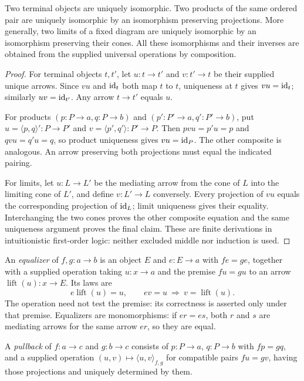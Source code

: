 \begin{proposition}\label{prop:universal-unique}
Two terminal objects are uniquely isomorphic.  Two products of the same
ordered pair are uniquely isomorphic by an isomorphism preserving projections.
More generally, two limits of a fixed diagram are uniquely isomorphic by an
isomorphism preserving their cones.  All these isomorphisms and their inverses
are obtained from the supplied universal operations by composition.
\end{proposition}
\begin{proof}
For terminal objects $t,t'$, let $u:t\to t'$ and $v:t'\to t$ be their supplied
unique arrows.  Since $vu$ and $\operatorname{id}_t$ both map $t$ to $t$, uniqueness at $t$
gives $vu=\operatorname{id}_t$; similarly $uv=\operatorname{id}_{t'}$.  Any arrow $t\to t'$ equals $u$.

For products $(p:P\to a,q:P\to b)$ and $(p':P'\to a,q':P'\to b)$, put
$u=\langle p,q\rangle':P\to P'$ and
$v=\langle p',q'\rangle:P'\to P$.  Then $pvu=p'u=p$ and $qvu=q'u=q$, so
product uniqueness gives $vu=\operatorname{id}_P$.  The other composite is analogous.
An arrow preserving both projections must equal the indicated pairing.

For limits, let $u:L\to L'$ be the mediating arrow from the cone of $L$
into the limiting cone of $L'$, and define $v:L'\to L$ conversely.  Every
projection of $vu$ equals the corresponding projection of $\operatorname{id}_L$; limit
uniqueness gives their equality.  Interchanging the two cones proves the
other composite equation and the same uniqueness argument proves the final
claim.  These are finite derivations in intuitionistic first-order logic:
neither excluded middle nor induction is used.
\end{proof}

An \emph{equalizer} of $f,g:a\to b$ is an object $E$ and $e:E\to a$ with
$fe=ge$, together with a supplied operation taking $u:x\to a$ and the premise
$fu=gu$ to an arrow $\operatorname{lift}(u):x\to E$.  Its laws are
\[
 e\operatorname{lift}(u)=u,
 \qquad ev=u\ \Longrightarrow\ v=\operatorname{lift}(u).
\]
The operation need not test the premise: its correctness is asserted only
under that premise.  Equalizers are monomorphisms: if $er=es$, both $r$ and
$s$ are mediating arrows for the same arrow $er$, so they are equal.

A \emph{pullback} of $f:a\to c$ and $g:b\to c$ consists of
$p:P\to a$, $q:P\to b$ with $fp=gq$, and a supplied operation
$(u,v)\mapsto\langle u,v\rangle_{f,g}$ for compatible pairs $fu=gv$, having
those projections and uniquely determined by them.

